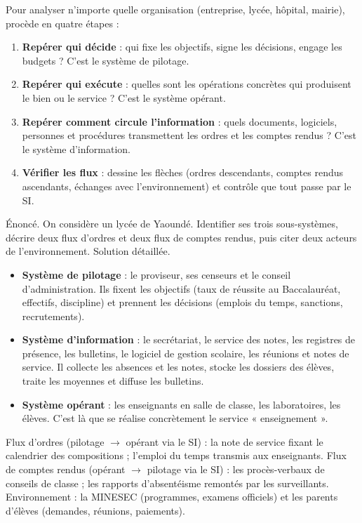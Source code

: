 \documentclass[11pt]{article}
\newcounter{popsec}
\newcounter{popsub}
\newcommand{\courssub}[1]{%
  \stepcounter{popsub}%
  \par\vspace{9pt}\noindent{\popxbold\fontsize{11.5}{13}\selectfont\color{popink}{\color{poporange}\thepopsec.\thepopsub}\hspace{6pt}#1}\par\nopagebreak\vspace{4pt}
}
\begin{document}
\courssub{Méthode d'analyse et exemples résolus}

\begin{methode}
Pour analyser n'importe quelle organisation (entreprise, lycée, hôpital, mairie), procède en quatre étapes :
\begin{enumerate}
  \item \textbf{Repérer qui décide} : qui fixe les objectifs, signe les décisions, engage les budgets ? C'est le système de pilotage.
  \item \textbf{Repérer qui exécute} : quelles sont les opérations concrètes qui produisent le bien ou le service ? C'est le système opérant.
  \item \textbf{Repérer comment circule l'information} : quels documents, logiciels, personnes et procédures transmettent les ordres et les comptes rendus ? C'est le système d'information.
  \item \textbf{Vérifier les flux} : dessine les flèches (ordres descendants, comptes rendus ascendants, échanges avec l'environnement) et contrôle que tout passe par le SI.
\end{enumerate}
\end{methode}

\begin{exoresolu}
Énoncé. On considère un lycée de Yaoundé. Identifier ses trois sous-systèmes, décrire deux flux d'ordres et deux flux de comptes rendus, puis citer deux acteurs de l'environnement.
\tcblower
Solution détaillée.
\begin{itemize}
  \item \textbf{Système de pilotage} : le proviseur, ses censeurs et le conseil d'administration. Ils fixent les objectifs (taux de réussite au Baccalauréat, effectifs, discipline) et prennent les décisions (emplois du temps, sanctions, recrutements).
  \item \textbf{Système d'information} : le secrétariat, le service des notes, les registres de présence, les bulletins, le logiciel de gestion scolaire, les réunions et notes de service. Il collecte les absences et les notes, stocke les dossiers des élèves, traite les moyennes et diffuse les bulletins.
  \item \textbf{Système opérant} : les enseignants en salle de classe, les laboratoires, les élèves. C'est là que se réalise concrètement le service « enseignement ».
\end{itemize}
Flux d'ordres (pilotage $\rightarrow$ opérant via le SI) : la note de service fixant le calendrier des compositions ; l'emploi du temps transmis aux enseignants. Flux de comptes rendus (opérant $\rightarrow$ pilotage via le SI) : les procès-verbaux de conseils de classe ; les rapports d'absentéisme remontés par les surveillants. Environnement : la MINESEC (programmes, examens officiels) et les parents d'élèves (demandes, réunions, paiements).
\end{exoresolu}
\end{document}
